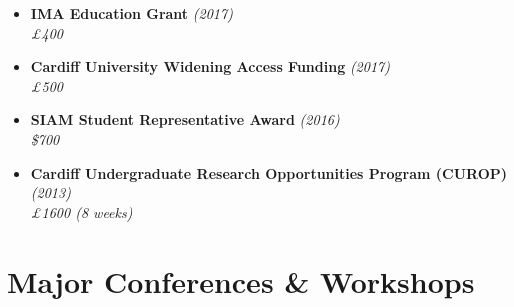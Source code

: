 \documentclass[10pt,a4paper,sans]{moderncv}        %
\begin{document}
\begin{multicols}{2}
\begin{itemize}
			\item \textbf{IMA Education Grant} \textit{(2017)}\\
			\textit{£400}
			
			\vspace{6pt}
			
			\item \textbf{Cardiff University Widening Access Funding} \textit{(2017)}\\
			\textit{£500}
			
			\vspace{6pt}
			
			\item \textbf{SIAM Student Representative Award} \textit{(2016)}\\
			\textit{\$700}
			
			\vspace{6pt}
			
			\item \textbf{Cardiff Undergraduate Research Opportunities Program (CUROP)} \textit{(2013)} \\
			\textit{£1600 (8 weeks)}
			
		\end{itemize}
	\end{multicols}
	
	\section{Major Conferences \& Workshops}
	
	\vspace{6pt}
	
\end{document}
